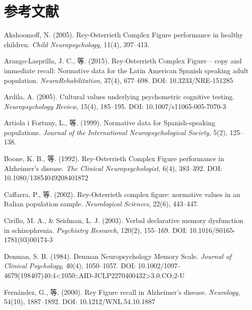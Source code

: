 \documentclass[12pt,a4paper]{ctexart}
\begin{document}
\newpage
\section*{参考文献}

\begin{enumerate}[leftmargin=2em,label={[\arabic*]}]

\item Akshoomoff, N. (2005). Rey-Osterrieth Complex Figure performance in healthy children. \textit{Child Neuropsychology}, 11(4), 397–413.

\item Arango-Lasprilla, J. C., 等. (2015). Rey-Osterrieth Complex Figure – copy and immediate recall: Normative data for the Latin American Spanish speaking adult population. \textit{NeuroRehabilitation}, 37(4), 677–698. DOI: 10.3233/NRE-151285

\item Ardila, A. (2005). Cultural values underlying psychometric cognitive testing. \textit{Neuropsychology Review}, 15(4), 185–195. DOI: 10.1007/s11065-005-7070-3

\item Artiola i Fortuny, L., 等. (1999). Normative data for Spanish-speaking populations. \textit{Journal of the International Neuropsychological Society}, 5(2), 125–138.

\item Boone, K. B., 等. (1992). Rey-Osterrieth Complex Figure performance in Alzheimer's disease. \textit{The Clinical Neuropsychologist}, 6(4), 383–392. DOI: 10.1080/13854049208401872

\item Caffarra, P., 等. (2002). Rey-Osterrieth complex figure: normative values in an Italian population sample. \textit{Neurological Sciences}, 22(6), 443–447.

\item Cirillo, M. A., \& Seidman, L. J. (2003). Verbal declarative memory dysfunction in schizophrenia. \textit{Psychiatry Research}, 120(2), 155–169. DOI: 10.1016/S0165-1781(03)00174-3

\item Denman, S. B. (1984). Denman Neuropsychology Memory Scale. \textit{Journal of Clinical Psychology}, 40(4), 1050–1057. DOI: 10.1002/1097-4679(198407)40:4<1050::AID-JCLP2270400432>3.0.CO;2-U

\item Fernández, G., 等. (2000). Rey Figure recall in Alzheimer's disease. \textit{Neurology}, 54(10), 1887–1892. DOI: 10.1212/WNL.54.10.1887


\end{enumerate}
\end{document}

